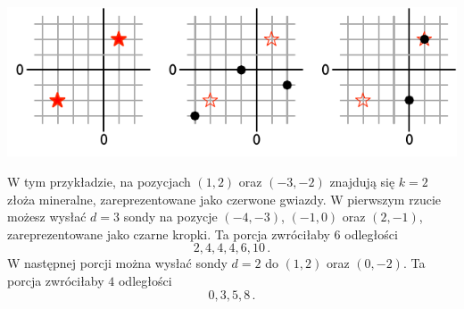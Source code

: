 \includegraphics[width=.6\textwidth]{img/sample1.pdf}

W tym przykładzie, na pozycjach $(1,2)$ oraz $(-3,-2)$ znajdują się $k=2$ złoża mineralne, zareprezentowane jako czerwone gwiazdy.
W pierwszym rzucie możesz wysłać $d=3$ sondy na pozycje $(-4,-3)$, $(-1, 0)$ oraz $(2,-1)$, zareprezentowane jako czarne kropki.
Ta porcja zwróciłaby $6$ odległości \[
  2, 4, 4, 4, 6, 10\,.
\]
 W następnej porcji można wysłać sondy $d=2$ do $(1,2)$ oraz $(0,-2)$.
Ta porcja zwróciłaby $4$ odległości \[
  0, 3, 5, 8\,.
\]
